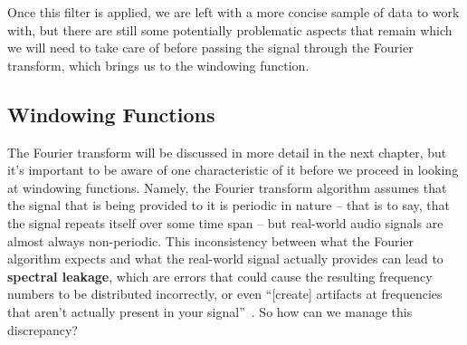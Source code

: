 \documentclass[12pt]{report}
\begin{document}
\indent Once this filter is applied, we are left with a more concise sample of data to work with, but there are still some potentially problematic aspects that remain which we will need to take care of before passing the signal through the Fourier transform, which brings us to the windowing function.

\subsection*{Windowing Functions}
\indent The Fourier transform will be discussed in more detail in the next chapter, but it's important to be aware of one characteristic of it before we proceed in looking at windowing functions. Namely, the Fourier transform algorithm assumes that the signal that is being provided to it is periodic in nature -- that is to say, that the signal repeats itself over some time span -- but real-world audio signals are almost always non-periodic. This inconsistency between what the Fourier algorithm expects and what the real-world signal actually provides can lead to {\bf spectral leakage}, which are errors that could cause the resulting frequency numbers to be distributed incorrectly, or even ``[create] artifacts at frequencies that aren't actually present in your signal''~\cite{Roche2012a}. So how can we manage this discrepancy?
\end{document}
